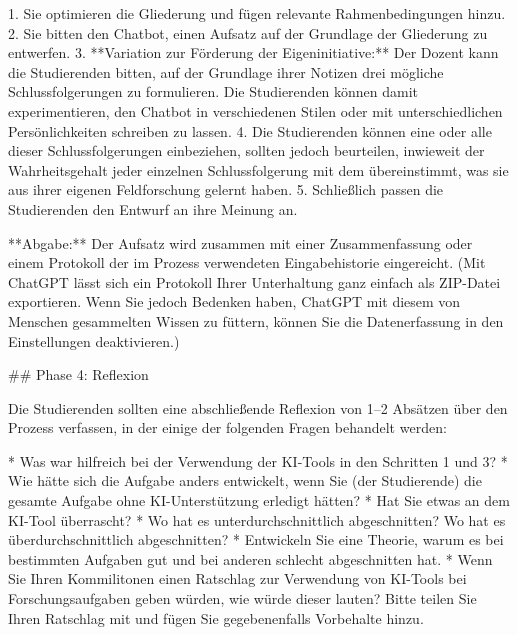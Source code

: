 \documentclass[
  ngerman,
  letterpaper,
  DIV=11]{scrreprt}
\newenvironment{Shaded}{\begin{snugshade}}{\end{snugshade}}
\newcommand{\FunctionTok}[1]{\textcolor[rgb]{0.28,0.35,0.67}{#1}}
\newcommand{\NormalTok}[1]{\textcolor[rgb]{0.00,0.23,0.31}{#1}}
\newcommand{\SpecialStringTok}[1]{\textcolor[rgb]{0.13,0.47,0.30}{#1}}
\begin{document}
\begin{tcolorbox}
\begin{Shaded}
\begin{Highlighting}[]
\SpecialStringTok{1.  }\NormalTok{Sie optimieren die Gliederung und fügen relevante Rahmenbedingungen hinzu.}
\SpecialStringTok{2.  }\NormalTok{Sie bitten den Chatbot, einen Aufsatz auf der Grundlage der Gliederung zu entwerfen.}
\SpecialStringTok{3.  }\NormalTok{**Variation zur Förderung der Eigeninitiative:** Der Dozent kann die Studierenden bitten, auf der Grundlage ihrer Notizen drei mögliche Schlussfolgerungen zu formulieren. Die Studierenden können damit experimentieren, den Chatbot in verschiedenen Stilen oder mit unterschiedlichen Persönlichkeiten schreiben zu lassen.}
\SpecialStringTok{4.  }\NormalTok{Die Studierenden können eine oder alle dieser Schlussfolgerungen einbeziehen, sollten jedoch beurteilen, inwieweit der Wahrheitsgehalt jeder einzelnen Schlussfolgerung mit dem übereinstimmt, was sie aus ihrer eigenen Feldforschung gelernt haben.}
\SpecialStringTok{5.  }\NormalTok{Schließlich passen die Studierenden den Entwurf an ihre Meinung an.}

\NormalTok{**Abgabe:**}
\NormalTok{Der Aufsatz wird zusammen mit einer Zusammenfassung oder einem Protokoll der im Prozess verwendeten Eingabehistorie eingereicht. (Mit ChatGPT lässt sich ein Protokoll Ihrer Unterhaltung ganz einfach als ZIP{-}Datei exportieren. Wenn Sie jedoch Bedenken haben, ChatGPT mit diesem von Menschen gesammelten Wissen zu füttern, können Sie die Datenerfassung in den Einstellungen deaktivieren.)}

\FunctionTok{\#\# Phase 4: Reflexion}

\NormalTok{Die Studierenden sollten eine abschließende Reflexion von 1–2 Absätzen über den Prozess verfassen, in der einige der folgenden Fragen behandelt werden:}

\SpecialStringTok{* }\NormalTok{Was war hilfreich bei der Verwendung der KI{-}Tools in den Schritten 1 und 3?}
\SpecialStringTok{* }\NormalTok{Wie hätte sich die Aufgabe anders entwickelt, wenn Sie (der Studierende) die gesamte Aufgabe ohne KI{-}Unterstützung erledigt hätten?}
\SpecialStringTok{* }\NormalTok{Hat Sie etwas an dem KI{-}Tool überrascht?}
\SpecialStringTok{* }\NormalTok{Wo hat es unterdurchschnittlich abgeschnitten? Wo hat es überdurchschnittlich abgeschnitten?}
\SpecialStringTok{* }\NormalTok{Entwickeln Sie eine Theorie, warum es bei bestimmten Aufgaben gut und bei anderen schlecht abgeschnitten hat.}
\SpecialStringTok{* }\NormalTok{Wenn Sie Ihren Kommilitonen einen Ratschlag zur Verwendung von KI{-}Tools bei Forschungsaufgaben geben würden, wie würde dieser lauten? Bitte teilen Sie Ihren Ratschlag mit und fügen Sie gegebenenfalls Vorbehalte hinzu.}
\end{Highlighting}
\end{Shaded}

\end{tcolorbox}
\end{document}
